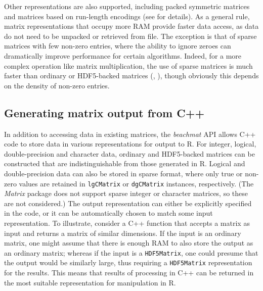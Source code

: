 \documentclass[10pt,letterpaper]{article}
\newcommand{\beachmat}{\textit{beachmat}}
\newcommand{\code}[1]{\texttt{#1}}
\begin{document}
Other representations are also supported, including packed symmetric matrices and matrices based on run-length encodings (see \suppsecother{} for details).
As a general rule, matrix representations that occupy more RAM provide faster data access, as data do not need to be unpacked or retrieved from file.
The exception is that of sparse matrices with few non-zero entries, where the ability to ignore zeroes can dramatically improve performance for certain algorithms.
Indeed, for a more complex operation like matrix multiplication, the use of sparse matrices is much faster than ordinary or HDF5-backed matrices (\suppsecmatmult{}, \suppfigmatmult{}), though obviously this depends on the density of non-zero entries.

\subsection*{Generating matrix output from C++}
In addition to accessing data in existing matrices, the \beachmat{} API allows C++ code to store data in various representations for output to R.
For integer, logical, double-precision and character data, ordinary and HDF5-backed matrices can be constructed that are indistinguishable from those generated in R.
Logical and double-precision data can also be stored in sparse format, where only true or non-zero values are retained in \code{lgCMatrix} or \code{dgCMatrix} instances, respectively.
(The \textit{Matrix} package does not support sparse integer or character matrices, so these are not considered.)
The output representation can either be explicitly specified in the code, or it can be automatically chosen to match some input representation.
To illustrate, consider a C++ function that accepts a matrix as input and returns a matrix of similar dimensions.
If the input is an ordinary matrix, one might assume that there is enough RAM to also store the output as an ordinary matrix;
whereas if the input is a \code{HDF5Matrix}, one could presume that the output would be similarly large, thus requiring a \code{HDF5Matrix} representation for the results.
This means that results of processing in C++ can be returned in the most suitable representation for manipulation in R.
 
\end{document}
